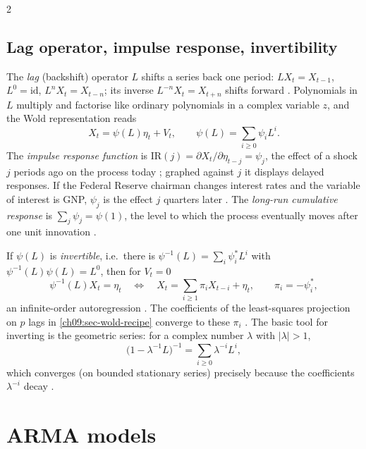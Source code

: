 \begin{paracol}{2}
\subsection{Lag operator, impulse response, invertibility}\label{ch09:sec-lag}
The \emph{lag} (backshift) operator $L$ shifts a series back one period: $LX_t=X_{t-1}$, $L^0=\mathrm{id}$,
$L^nX_t=X_{t-n}$; its inverse $L^{-n}X_t=X_{t+n}$ shifts forward . Polynomials in $L$ multiply
and factorise like ordinary polynomials in a complex variable $z$, and the Wold representation reads
\begin{equation}\label{ch09:eq-woldL}
  X_t=\psi(L)\eta_t+V_t,\qquad \psi(L)=\sum_{i\ge0}\psi_iL^i .
\end{equation}
The \emph{impulse response function} is $\mathrm{IR}(j)=\partial X_t/\partial\eta_{t-j}=\psi_j$, the effect of a
shock $j$ periods ago on the process today ; graphed against $j$ it displays delayed
responses. If the Federal Reserve chairman changes interest rates and the variable of interest is GNP,
$\psi_j$ is the effect $j$ quarters later . The \emph{long-run cumulative response} is
$\sum_j\psi_j=\psi(1)$, the level to which the process eventually moves after one unit innovation
.

If $\psi(L)$ is \emph{invertible}, i.e.\ there is $\psi^{-1}(L)=\sum_i\psi^*_iL^i$ with
$\psi^{-1}(L)\psi(L)=L^0$, then for $V_t=0$
\begin{equation}\label{ch09:eq-arinf}
  \psi^{-1}(L)X_t=\eta_t\quad\Longleftrightarrow\quad X_t=\sum_{i\ge1}\pi_iX_{t-i}+\eta_t,\qquad \pi_i=-\psi^*_i,
\end{equation}
an infinite-order autoregression . The coefficients of the
least-squares projection on $p$ lags in \cref{ch09:sec-wold-recipe} converge to these $\pi_i$
. The basic tool for inverting is the geometric series: for a complex number $\lambda$ with
$|\lambda|>1$,
\begin{equation}\label{ch09:eq-geom}
  \bigl(1-\lambda^{-1}L\bigr)^{-1}=\sum_{i\ge0}\lambda^{-i}L^i,
\end{equation}
which converges (on bounded stationary series) precisely because the coefficients $\lambda^{-i}$ decay
.

\section{ARMA models}\label{ch09:sec-arma}


\end{paracol}
